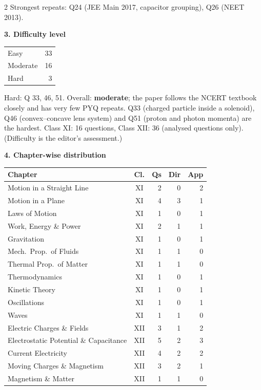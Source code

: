 \begin{multicols}{2}
{\footnotesize Strongest repeats: Q24 (JEE Main 2017, capacitor grouping), Q26 (NEET 2013).}\par\medskip
\textbf{\color{crimson}3. Difficulty level}\par\smallskip
\begin{tabular}{@{}lr@{}}\toprule
Easy & 33\\ Moderate & 16\\ Hard & 3\\\bottomrule\end{tabular}\par\smallskip
{\footnotesize Hard: Q 33, 46, 51. Overall: \textbf{moderate}; the paper follows the NCERT textbook closely and has very few PYQ repeats. Q33 (charged particle inside a solenoid), Q46 (convex--concave lens system) and Q51 (proton and photon momenta) are the hardest. Class XI: 16 questions, Class XII: 36 (analysed questions only). (Difficulty is the editor's assessment.)}\par\medskip
\columnbreak
\textbf{\color{crimson}4. Chapter-wise distribution}\par\smallskip
{\footnotesize\begin{tabular}{@{}p{4.7cm}c@{\,}r@{\,}r@{\,}r@{}}\toprule
Chapter & Cl. & Qs & Dir & App\\\midrule
Motion in a Straight Line & XI & 2 & 0 & 2\\
Motion in a Plane & XI & 4 & 3 & 1\\
Laws of Motion & XI & 1 & 0 & 1\\
Work, Energy \& Power & XI & 2 & 1 & 1\\
Gravitation & XI & 1 & 0 & 1\\
Mech.\ Prop.\ of Fluids & XI & 1 & 1 & 0\\
Thermal Prop.\ of Matter & XI & 1 & 1 & 0\\
Thermodynamics & XI & 1 & 0 & 1\\
Kinetic Theory & XI & 1 & 0 & 1\\
Oscillations & XI & 1 & 0 & 1\\
Waves & XI & 1 & 1 & 0\\
Electric Charges \& Fields & XII & 3 & 1 & 2\\
Electrostatic Potential \& Capacitance & XII & 5 & 2 & 3\\
Current Electricity & XII & 4 & 2 & 2\\
Moving Charges \& Magnetism & XII & 3 & 2 & 1\\
Magnetism \& Matter & XII & 1 & 1 & 0\\

\end{tabular}}
\end{multicols}
